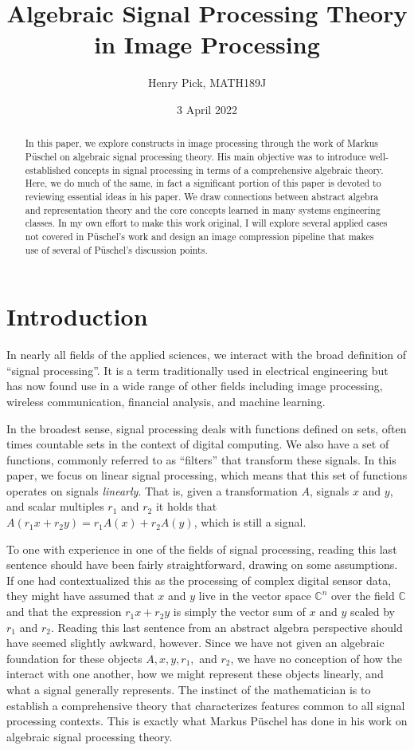 \documentclass[12pt,technote]{IEEEtran}
\author{Henry Pick, MATH189J}
\title{Algebraic Signal Processing Theory in Image Processing}
\date{3 April 2022}
\begin{document}
\maketitle
\begin{abstract}
    In this paper, we explore constructs in image processing through the work of Markus P\"uschel on algebraic signal processing theory. His main objective was to introduce well-established concepts in signal processing in terms of a comprehensive algebraic theory. Here, we do much of the same, in fact a significant portion of this paper is devoted to reviewing essential ideas in his paper. We draw connections between abstract algebra and representation theory and the core concepts learned in many systems engineering classes. In my own effort to make this work original, I will explore several applied cases not covered in P\"uschel's work and design an image compression pipeline that makes use of several of P\"uschel's discussion points.
\end{abstract}
\section{Introduction}
In nearly all fields of the applied sciences, we interact with the broad definition of ``signal processing''. It is a term traditionally used in electrical engineering but has now found use in a wide range of other fields including image processing, wireless communication, financial analysis, and machine learning.

In the broadest sense, signal processing deals with functions defined on sets, often times countable sets in the context of digital computing. We also have a set of functions, commonly referred to as ``filters'' that transform these signals. In this paper, we focus on linear signal processing, which means that this set of functions operates on signals \textit{linearly}. That is, given a transformation $A$, signals $x$ and $y$, and scalar multiples $r_1$ and $r_2$ it holds that $A(r_1x + r_2y) = r_1A(x) + r_2A(y)$, which is still a signal.

To one with experience in one of the fields of signal processing, reading this last sentence should have been fairly straightforward, drawing on some assumptions. If one had contextualized this as the processing of complex digital sensor data, they might have assumed that $x$ and $y$ live in the vector space $\mathbb{C}^n$ over the field $\mathbb{C}$ and that the expression $r_1x + r_2y$ is simply the vector sum of $x$ and $y$ scaled by $r_1$ and $r_2$. Reading this last sentence from an abstract algebra perspective should have seemed slightly awkward, however. Since we have not given an algebraic foundation for these objects $A, x, y, r_1,$ and $r_2$, we have no conception of how the interact with one another, how we might represent these objects linearly, and what a signal generally represents. The instinct of the mathematician is to establish a comprehensive theory that characterizes features common to all signal processing contexts. This is exactly what Markus P\"uschel has done in his work on algebraic signal processing theory\cite{AlgebraicSignalProcessing2006}.
\end{document}
